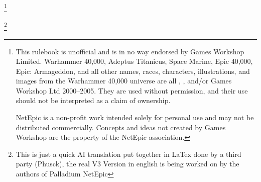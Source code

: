 \footnote{This rulebook is unofficial and is in no way endorsed by Games Workshop Limited. Warhammer 40,000, Adeptus Titanicus, Space Marine, Epic 40,000, Epic: Armageddon, and all other names, races, characters, illustrations, and images from the Warhammer 40,000 universe are all \textregistered{}, \texttrademark{}, and/or \textcopyright{} Games Workshop Ltd 2000--2005. They are used without permission, and their use should not be interpreted as a claim of ownership.

NetEpic is a non-profit work intended solely for personal use and may not be distributed commercially. Concepts and ideas not created by Games Workshop are the property of the NetEpic association.}

\footnote{This is just a quick AI translation put together in LaTex done by a third party (Phusck), the real V3 Version in english is being worked on by the authors of Palladium NetEpic }